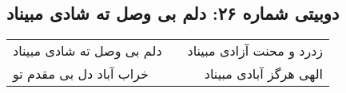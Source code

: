 \begin{center}
\section*{دوبیتی شماره ۲۶: دلم بی وصل ته شادی مبیناد}
\label{sec:026}
\begin{longtable}{l p{0.5cm} r}
دلم بی وصل ته شادی مبیناد
&&
زدرد و محنت آزادی مبیناد
\\
خراب آباد دل بی مقدم تو
&&
الهی هرگز آبادی مبیناد
\\
\end{longtable}
\end{center}
